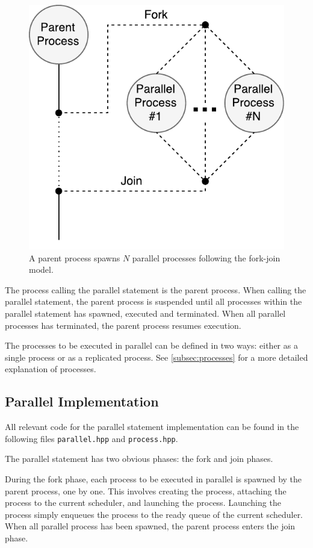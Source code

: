\begin{figure}[h!]
    \centering
    \includegraphics[width=0.6\linewidth]{fig/fork_join}
    \caption{A parent process spawns $N$ parallel processes following the fork\hyp{}join model.}
    \label{fig:fork_join_model}
\end{figure}

The process calling the parallel statement is the parent process. When calling the parallel statement, the parent process is suspended until all processes within the parallel statement has spawned, executed and terminated. When all parallel processes has terminated, the parent process resumes execution. 

The processes to be executed in parallel can be defined in two ways: either as a single process or as a replicated process. See \cref{subsec:processes} for a more detailed explanation of processes. 


\FloatBarrier
\subsection{Parallel Implementation}
\label{subsec:parallel_implementation}

All relevant code for the parallel statement implementation can be found in the following files \texttt{parallel.hpp} and \texttt{process.hpp}.

The parallel statement has two obvious phases: the fork and join phases. 

During the fork phase, each process to be executed in parallel is spawned by the parent process, one by one. This involves creating the process, attaching the process to the current scheduler, and launching the process. Launching the process simply enqueues the process to the ready queue of the current scheduler. When all parallel process has been spawned, the parent process enters the join phase.

